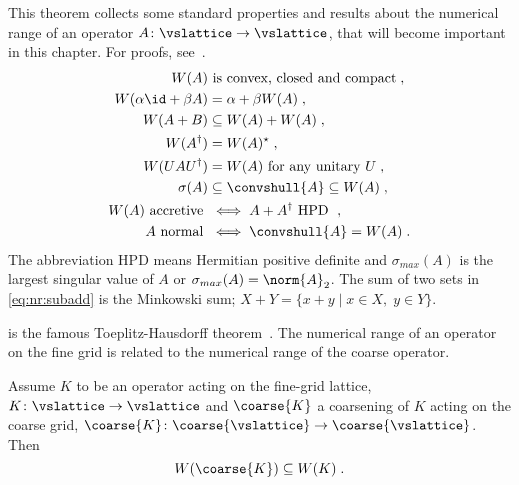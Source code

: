 \begin{theorem} \label{thm:nr:properties}
This theorem collects some standard properties and results about the numerical range of an operator $A \colon \vslattice \rightarrow \vslattice$, that will become important in this chapter.
For proofs, see~\cite{gustafson1997numerical}.
\begin{align}
    W(A) &\text{ is convex, closed and compact} \;,                     \label{eq:nr:convex}    \\
    W(\alpha \id + \beta A) &= \alpha + \beta W(A) \;,                  \label{eq:nr:linear}    \\
    W(A + B) &\subseteq W(A) + W(A) \;,                                 \label{eq:nr:subadd}    \\
    W(A^{\dagger}) &= W(A)^{\star} \;,                                  \label{eq:nr:dagger}    \\
    W(U A U^{\dagger}) &= W(A) \text{ for any unitary $U$} \;,          \label{eq:nr:unitary}   \\
    \sigma(A) &\subseteq \convshull{A} \subseteq W(A) \;,               \label{eq:nr:convhull}  \\
    W(A) \text{ accretive } &\iff A+A^{\dagger} \text{ HPD } \;,        \label{eq:nr:accretive} \\
    A \text{ normal } &\iff \convshull{A} = W(A) \;.                    \label{eq:nr:normal}    %
\end{align}
The abbreviation HPD means Hermitian positive definite and $\sigma_{max}(A)$ is the largest singular value of $A$ or $\sigma_{max}(A) = \norm{A}_2$.
The sum of two sets in \cref{eq:nr:subadd} is the Minkowski sum; $X+Y = \{x+y \mid x \in X, \; y \in Y\}$.
\end{theorem}

 is the famous Toeplitz-Hausdorff theorem~\cite{toeplitz1918algebraische,hausdorff1919wertvorrat}.
The numerical range of an operator on the fine grid is related to the numerical range of the coarse operator.

\begin{theorem} \label{thm:numerical:range}
Assume $K$ to be an operator acting on the fine-grid lattice, $K \colon \vslattice \rightarrow \vslattice$ and $\coarse{K}$ a coarsening of $K$ acting on the coarse grid, $\coarse{K} \colon \coarse{\vslattice} \rightarrow \coarse{\vslattice}$.
Then
\begin{equation}
W(\coarse{K}) \subseteq W(K) \;.
\end{equation}
\end{theorem}

